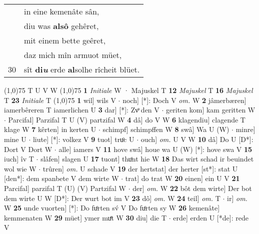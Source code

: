\documentclass[8pt,a4paper,notitlepage]{article}
\begin{document}
\begin{table}[ht]
\begin{minipage}[t]{0.5\linewidth}
\begin{tabular}{rl}
 & in eine kemenâte sân,\\ 
 & diu was \textbf{alsô} gehêret,\\ 
 & mit einem bette geêret,\\ 
 & daz mich mîn armuot müet,\\ 
30 & sît \textbf{di\textit{u}} erde \textbf{al}solhe rîcheit blüet.\\ 
\end{tabular}
\scriptsize
\line(1,0){75} \newline
T U V W \newline
\line(1,0){75} \newline
\textbf{1} \textit{Initiale} W  · Majuskel T  \textbf{12} \textit{Majuskel} T  \textbf{16} \textit{Majuskel} T  \textbf{23} \textit{Initiale} T  \newline
\line(1,0){75} \newline
\textbf{1} wil] wils V  $\cdot$ noch] [*]: Doch V \textit{om.} W \textbf{2} jâmerbæren] iamerbêreren T iamerlichen U \textbf{3} dar] [*]: Zvͦ den V  $\cdot$ geriten kom] kam geritten W  $\cdot$ Parcifal] Parzifal T U (V) partzifal W \textbf{4} dâ] do V W \textbf{6} klagendiu] clagende T klage W \textbf{7} kêrten] in kerten U  $\cdot$ schimpf] schimpffen W \textbf{8} swâ] Wa U (W)  $\cdot$ minre] mine U  $\cdot$ liute] [*]: volkez V \textbf{9} tuot] truͦc U  $\cdot$ ouch] \textit{om.} U V W \textbf{10} dâ] Do U [D*]: Dort V Dort W  $\cdot$ alle] iamers V \textbf{11} hove swâ] houe wa U (W) [*]: hove swa  V \textbf{15} iuch] îv T  $\cdot$ slâfen] slagen U \textbf{17} tuont] thuͦnt hie W \textbf{18} Das wirt schad ir beuindet wol wie W  $\cdot$ trûren] \textit{om.} U schade V \textbf{19} der hertstat] der herter [st*]: stat U [den*]: dem spanbete V dem wirte W  $\cdot$ trat] do trat W \textbf{20} einen] ein U V \textbf{21} Parcifal] parzifal T (U) (V) Partzifal W  $\cdot$ der] \textit{om.} W \textbf{22} bôt dem wirte] Der bot dem wirte U W [D*]: Der wurt bot im V \textbf{23} dô] \textit{om.} W \textbf{24} teil] \textit{om.} T  $\cdot$ ir] \textit{om.} W \textbf{25} unde vuorten] [*]: Do fuͦrten sv́ V Do fuͦrten sy W \textbf{26} kemenâte] kemmenaten W \textbf{29} müet] ymer muͤt W \textbf{30} diu] die T  $\cdot$ erde] erden U [*de]: rede V \newline
\end{minipage}
\end{table}
\end{document}
